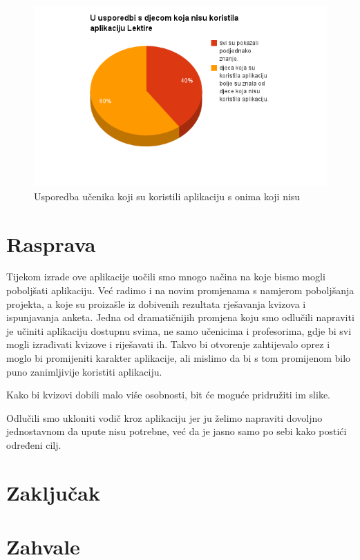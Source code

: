 \documentclass{scrreprt}
\begin{document}
\begin{figure}[H]
  \includegraphics[width=\textwidth, clip=true, trim=0 2.5cm 0 0]{comparison}
  \caption{Usporedba učenika koji su koristili aplikaciju s onima koji nisu}
\end{figure}

\chapter{Rasprava}

Tijekom izrade ove aplikacije uočili smo mnogo načina na koje bismo mogli
poboljšati aplikaciju. Već radimo i na novim promjenama s namjerom poboljšanja
projekta, a koje su proizašle iz dobivenih rezultata rješavanja kvizova i
ispunjavanja anketa. Jedna od dramatičnijih promjena koju smo odlučili napraviti
je učiniti aplikaciju dostupnu svima, ne samo učenicima i profesorima, gdje bi
svi mogli izrađivati kvizove i riješavati ih. Takvo bi otvorenje zahtijevalo
oprez i moglo bi promijeniti karakter aplikacije, ali mislimo da bi s tom
promijenom bilo puno zanimljivije koristiti aplikaciju.

Kako bi kvizovi dobili malo više osobnosti, bit će moguće pridružiti im slike.

Odlučili smo ukloniti vodič kroz aplikaciju jer ju želimo napraviti dovoljno
jednostavnom da upute nisu potrebne, već da je jasno samo po sebi kako postići
određeni cilj.

\chapter{Zaključak}

\chapter{Zahvale}
\end{document}
